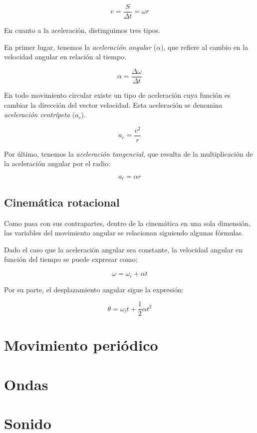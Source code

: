 \documentclass[12pt]{article}
\begin{document}
\begin{equation}
	v = \frac{S}{\Delta t} = \omega r
\end{equation}

En cuanto a la aceleración, distinguimos tres tipos.

En primer lugar,
tenemos la \textit{aceleración angular} (\(\alpha\)),
que refiere al cambio en la velocidad angular en relación al tiempo.

\begin{equation}
	\alpha = \frac{\Delta\omega}{\Delta t}
\end{equation}

En todo movimiento circular existe un tipo de aceleración cuya función es cambiar la dirección del vector velocidad.
Esta aceleración se denomina \textit{aceleración centrípeta} (\(a_{c}\)).

\begin{equation}
	a_{c} = \frac{v^{2}}{r}
\end{equation}

Por último,
tenemos la \textit{aceleración tangencial},
que resulta de la multiplicación de la aceleración angular por el radio:

\begin{equation}
	a_{t} = \alpha r
\end{equation}

\subsection{Cinemática rotacional}

Como pasa con sus contrapartes,
dentro de la cinemática en una sola dimensión,
las variables del movimiento angular se relacionan siguiendo algunas fórmulas.

Dado el caso que la aceleración angular sea constante, 
la velocidad angular en función del tiempo se puede expresar como:

\begin{equation}
	\omega = \omega_{i} + \alpha t
\end{equation}

Por su parte,
el desplazamiento angular sigue la expresión:

\begin{equation}
	\theta = \omega_{i}t + \frac{1}{2}\alpha t^{2}
\end{equation}

\pagebreak

\section{Movimiento periódico}

\pagebreak

\section{Ondas}

\pagebreak

\section{Sonido}
\end{document}
